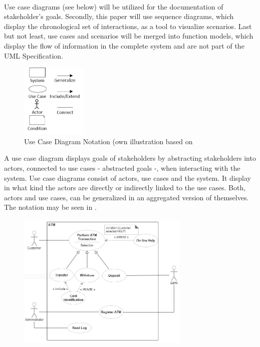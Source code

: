 \paragraph{}
Use case diagrams (see below) will be utilized for the documentation of stakeholder's goals. Secondly, this paper will use sequence diagrams, which display the chronological set of interactions, as a tool to visualize scenarios. Last but not least, use cases and scenarios will be merged into function models, which display the flow of information in the complete system and are not part of the UML Specification. 

\begin{figure}[H] 
    \centering
    \includegraphics[width=0.28\textwidth]{img/ucSymb.png}
    \caption{Use Case Diagram Notation (own illustration based on \cite[163]{Pohl.2007}}\label{fig:ucSymb}
\end{figure}

A use case diagram displays goals of stakeholders by abstracting stakeholders into actors, connected to use cases - abstracted goals -, when interacting with the system. Use case diagrams consist of actors, use cases and the system. It display in what kind the actors are directly or indirectly linked to the use cases. Both, actors and use cases, can be generalized in an aggregated version of themselves. The notation may be seen in .

\begin{figure}[H]
    \centering
    \includegraphics[width=0.73\textwidth]{img/ucEx.png}
    \label{fig:ucEx}
\end{figure}

